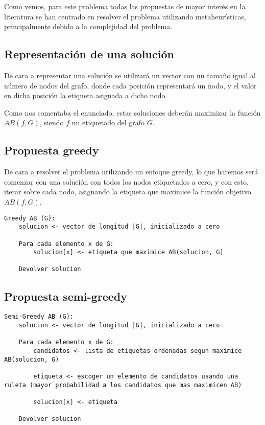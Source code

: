 Como vemos, para este problema todas las propuestas de mayor interés en la literatura se han centrado en resolver el problema utilizando metaheurísticas, principalmente debido a la complejidad del problema.

\subsection{Representación de una solución}

De cara a representar una solución se utilizará un vector con un tamaño igual al número de nodos del grafo, donde cada posición representará un nodo, y el valor en dicha posición la etiqueta asignada a dicho nodo.

Como nos comentaba el enunciado, estas soluciones deberán maximizar la función $AB(f, G)$, siendo $f$ un etiquetado del grafo $G$.

\subsection{Propuesta greedy}

De cara a resolver el problema utilizando un enfoque greedy, lo que haremos será comenzar con una solución con todos los nodos etiquetados a cero, y con esto, iterar sobre cada nodo, asignando la etiqueta que maximice la función objetivo $AB(f,G)$.

\begin{lstlisting}
Greedy AB (G):
	solucion <- vector de longitud |G|, inicializado a cero

	Para cada elemento x de G:
		solucion[x] <- etiqueta que maximice AB(solucion, G)

	Devolver solucion
\end{lstlisting}

\subsection{Propuesta semi-greedy}

\begin{lstlisting}
Semi-Greedy AB (G):
	solucion <- vector de longitud |G|, inicializado a cero

	Para cada elemento x de G:
		candidatos <- lista de etiquetas ordenadas segun maximice AB(solucion, G)

		etiqueta <- escoger un elemento de candidatos usando una ruleta (mayor probabilidad a los candidatos que mas maximicen AB)

		solucion[x] <- etiqueta

	Devolver solucion
\end{lstlisting}

